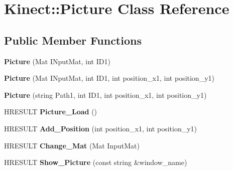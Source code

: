 \hypertarget{class_kinect_1_1_picture}{}\section{Kinect\+:\+:Picture Class Reference}
\label{class_kinect_1_1_picture}
\subsection*{Public Member Functions}
\begin{DoxyCompactItemize}
\item 
\mbox{\label{class_kinect_1_1_picture_a1973c135cd56e0d9b75a441848196ff3}} 
{\bfseries Picture} (Mat I\+Nput\+Mat, int I\+D1)
\item 
\mbox{\label{class_kinect_1_1_picture_a9a2b3daac3d834a53c02fefc92c589a9}} 
{\bfseries Picture} (Mat I\+Nput\+Mat, int I\+D1, int position\+\_\+x1, int position\+\_\+y1)
\item 
\mbox{\label{class_kinect_1_1_picture_a3cf936df6b643c31094db8e8f1ee629c}} 
{\bfseries Picture} (string Path1, int I\+D1, int position\+\_\+x1, int position\+\_\+y1)
\item 
\mbox{\label{class_kinect_1_1_picture_aac5ea70de6e7ac2714871decc6b7ee79}} 
H\+R\+E\+S\+U\+LT {\bfseries Picture\+\_\+\+Load} ()
\item 
\mbox{\label{class_kinect_1_1_picture_a0aab6a7605784e5afe9109fddac1c9d5}} 
H\+R\+E\+S\+U\+LT {\bfseries Add\+\_\+\+Position} (int position\+\_\+x1, int position\+\_\+y1)
\item 
\mbox{\label{class_kinect_1_1_picture_a7682eec940977d99ce23fdc1f90296a2}} 
H\+R\+E\+S\+U\+LT {\bfseries Change\+\_\+\+Mat} (Mat Input\+Mat)
\item 
\mbox{\label{class_kinect_1_1_picture_a202fcf89d2411c202aa8c536fa737daa}} 
H\+R\+E\+S\+U\+LT {\bfseries Show\+\_\+\+Picture} (const string \&window\+\_\+name)
\item 
\mbox{\label{class_kinect_1_1_picture_ac458cdef7efc9b75a6aefc94787fbde9}} 

\end{DoxyCompactItemize}
